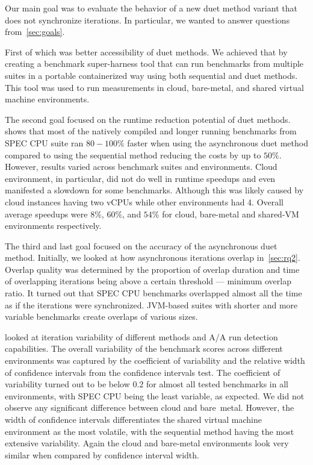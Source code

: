 
Our main goal was to evaluate the behavior of a new duet method variant that does not synchronize iterations.
In particular, we wanted to answer questions from~\cref{sec:goals}.

First of which was better accessibility of duet methods.
We achieved that by creating a benchmark super-harness tool that can run benchmarks from multiple suites in a portable containerized way using both sequential and duet methods.
This tool was used to run measurements in cloud, bare-metal, and shared virtual machine environments.

The second goal focused on the runtime reduction potential of duet methods.
 shows that most of the natively compiled and longer running benchmarks from SPEC CPU suite ran $80 - 100\%$ faster when using the asynchronous duet method compared to using the sequential method reducing the costs by up to $50\%$.
However, results varied across benchmark suites and environments.
Cloud environment, in particular, did not do well in runtime speedups and even manifested a slowdown for some benchmarks.
Although this was likely caused by cloud instances having two vCPUs while other environments had 4.
Overall average speedups were $8\%$, $60\%$, and $54\%$ for cloud, \mbox{bare-metal} and \mbox{shared-VM} environments respectively.

The third and last goal focused on the accuracy of the asynchronous duet method.
Initially, we looked at how asynchronous iterations overlap in~\cref{sec:rq2}.
Overlap quality was determined by the proportion of overlap duration and time of overlapping iterations being above a certain threshold --- minimum overlap ratio.
It turned out that SPEC CPU benchmarks overlapped almost all the time as if the iterations were synchronized.
\mbox{JVM-based} suites with shorter and more variable benchmarks create overlaps of various sizes.

 looked at iteration variability of different methods and A/A run detection capabilities.
The overall variability of the benchmark scores across different environments was captured by the coefficient of variability and the relative width of confidence intervals from the confidence intervals test.
The coefficient of variability turned out to be below $0.2$ for almost all tested benchmarks in all environments, with SPEC CPU being the least variable, as expected.
We did not observe any significant difference between cloud and \mbox{bare metal}.
However, the width of confidence intervals differentiates the shared virtual machine environment as the most volatile, with the sequential method having the most extensive variability.
Again the cloud and \mbox{bare-metal} environments look very similar when compared by confidence interval width.

